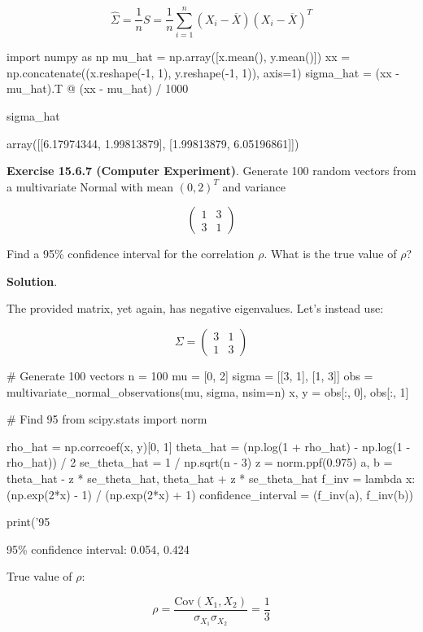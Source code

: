 \[ \hat{\Sigma} = \frac{1}{n} S = \frac{1}{n} \sum_{i=1}^n (X_i - \overline{X})(X_i - \overline{X})^T \]

\begin{python}
import numpy as np
mu_hat = np.array([x.mean(), y.mean()])
xx = np.concatenate((x.reshape(-1, 1), y.reshape(-1, 1)), axis=1)
sigma_hat = (xx - mu_hat).T @ (xx - mu_hat) / 1000

sigma_hat
\end{python}

\begin{console}
array([[6.17974344, 1.99813879],
       [1.99813879, 6.05196861]])
\end{console}

\textbf{Exercise 15.6.7 (Computer Experiment)}. Generate 100 random
vectors from a multivariate Normal with mean \((0, 2)^T\) and variance

\[ \begin{pmatrix}
1 & 3 \\
3 & 1
\end{pmatrix} \]

Find a 95\% confidence interval for the correlation \(\rho\). What is
the true value of \(\rho\)?

\textbf{Solution}.

The provided matrix, yet again, has negative eigenvalues. Let's instead
use:

\[\Sigma = \begin{pmatrix}
3 & 1 \\
1 & 3
\end{pmatrix}\]

\begin{python}
# Generate 100 vectors
n = 100
mu = [0, 2]
sigma = [[3, 1], [1, 3]]
obs = multivariate_normal_observations(mu, sigma, nsim=n)
x, y = obs[:, 0], obs[:, 1]
\end{python}

\begin{python}
# Find 95%
from scipy.stats import norm

rho_hat = np.corrcoef(x, y)[0, 1]
theta_hat = (np.log(1 + rho_hat) - np.log(1 - rho_hat)) / 2
se_theta_hat = 1 / np.sqrt(n - 3)
z = norm.ppf(0.975)
a, b = theta_hat - z * se_theta_hat, theta_hat + z * se_theta_hat
f_inv = lambda x: (np.exp(2*x) - 1) / (np.exp(2*x) + 1)
confidence_interval = (f_inv(a), f_inv(b))

print('95%
\end{python}


\begin{console}
95\% confidence interval: 0.054, 0.424
\end{console}

True value of \(\rho\):

\[ \rho = \frac{\text{Cov}(X_1, X_2)}{\sigma_{X_1} \sigma_{X_2}} = \frac{1}{3}\]
